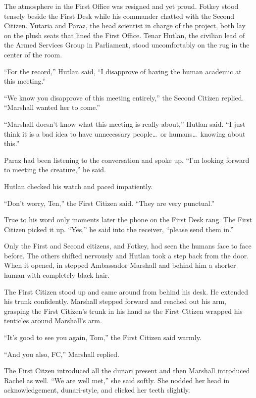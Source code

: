 

The atmosphere in the First Office was resigned and yet proud. Fotkey stood tensely beside the
First Desk while his commander chatted with the Second Citizen. Yutaria and Paraz, the head
scientist in charge of the project, both lay on the plush seats that lined the First Office.
Tenar Hutlan, the civilian lead of the Armed Services Group in Parliament, stood uncomfortably
on the rug in the center of the room.

``For the record,'' Hutlan said, ``I disapprove of having the human academic at this meeting.''

``We know you disapprove of this meeting entirely,'' the Second Citizen replied. ``Marshall
wanted her to come.''

``Marshall doesn't know what this meeting is really about,'' Hutlan said. ``I just think it is a
bad idea to have unnecessary people\ldots\ or humans\ldots\ knowing about this.''

Paraz had been listening to the conversation and spoke up. ``I'm looking forward to meeting the
creature,'' he said.

Hutlan checked his watch and paced impatiently.

``Don't worry, Ten,'' the First Citizen said. ``They are very punctual.''

True to his word only moments later the phone on the First Desk rang. The First Citizen picked
it up. ``Yes,'' he said into the receiver, ``please send them in.''

Only the First and Second citizens, and Fotkey, had seen the humans face to face before. The
others shifted nervously and Hutlan took a step back from the door. When it opened, in stepped
Ambassador Marshall and behind him a shorter human with completely black hair.

The First Citizen stood up and came around from behind his desk. He extended his trunk
confidently. Marshall stepped forward and reached out his arm, grasping the First Citizen's trunk
in his hand as the First Citizen wrapped his tenticles around Marshall's arm.

``It's good to see you again, Tom,'' the First Citizen said warmly.

``And you also, FC,'' Marshall replied.

The First Citzen introduced all the dunari present and then Marshall introduced Rachel as well.
``We are well met,'' she said softly. She nodded her head in acknowledgement, dunari-style, and
clicked her teeth slightly.

